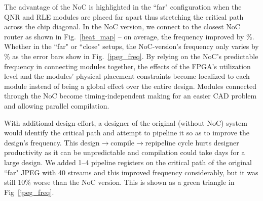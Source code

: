 The advantage of the NoC is highlighted in the ``far" configuration when the QNR and RLE modules are placed far apart thus stretching the critical path across the chip diagonal.
In the NoC version, we connect to the closest NoC router as shown in Fig.~\ref{heat_map} -- on average, the frequency improved by \%.
Whether in the ``far" or ``close" setups, the NoC-version's frequency only varies by \% as the error bars show in Fig.~\ref{jpeg_freq}.
By relying on the NoC's predictable frequency in connecting modules together, the effects of the FPGA's utilization level and the modules' physical placement constraints become localized to each module instead of being a global effect over the entire design.
Modules connected through the NoC become timing-independent making for an easier CAD problem and allowing parallel compilation.


With additional design effort, a designer of the original (without NoC) system would identify the critical path and attempt to pipeline it so as to improve the design's frequency.
This design$\rightarrow$compile$\rightarrow$repipeline cycle hurts designer productivity as it can be unpredictable and compilation could take days for a large design.
We added 1--4 pipeline registers on the critical path of the original ``far" JPEG with 40 streams and this improved frequency considerably, but it was still 10\% worse than the NoC version.
This is shown as a green triangle in Fig~\ref{jpeg_freq}.



